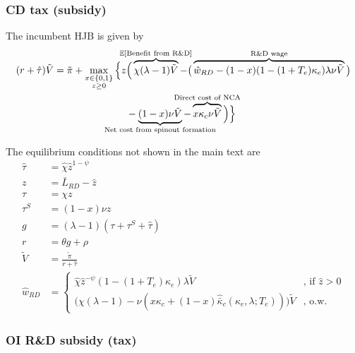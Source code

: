 \documentclass[11pt,english]{article}
\begin{document}
\subsubsection{CD tax (subsidy)}\label{appendix:model:efficiencyderivations:CDtax}

The incumbent HJB is given by 
\begin{align}
(r + \hat{\tau}) \tilde{V} = \tilde{\pi} + \max_{\substack{x \in \{0,1\} \\ z \ge 0}} \Big\{z &\Big( \overbrace{\chi (\lambda - 1) \tilde{V}}^{\mathclap{\mathbb{E}[\textrm{Benefit from R\&D}]}}-  \big( \overbrace{\hat{w}_{RD} - (1-x)(1-(1+T_e)\kappa_e)\lambda \nu \tilde{V}}^{\mathclap{\text{R\&D wage}}}\big) \label{eq:hjb_incumbent_entryTax} \nonumber \\ 
&-  \underbrace{(1-x) \nu \tilde{V}}_{\mathclap{\text{Net cost from spinout formation}}} - \overbrace{x \kappa_{c} \nu \tilde{V}}^{\mathclap{\text{Direct cost of NCA}}}\Big) \Big\} 
\end{align}

The equilibrium conditions not shown in the main text are
\begin{align}
\hat{\tau} &= \hat{\chi} \hat{z}^{1-\psi} \\
z &= \bar{L}_{RD} - \hat{z} \label{eq:labor_resource_constraint_entryTax}\\ 
\tau &= \chi z \\
\tau^S &= (1-x) \nu z \\
g &= (\lambda - 1) (\tau + \tau^S + \hat{\tau}) \\
r &= \theta g + \rho \\
\tilde{V} &= \frac{\tilde{\pi}}{r + \hat{\tau}} \\ 
\hat{w}_{RD} &= \begin{cases}
\hat{\chi} \hat{z}^{-\psi} (1-(1+T_e)\kappa_e) \lambda \tilde{V} &\textrm{, if } \hat{z} > 0\\
\Big( \chi(\lambda -1) - \nu (x\kappa_c + (1-x)\hat{\bar{\kappa}}_c(\kappa_e,\lambda;T_e))\Big) \tilde{V} &\textrm{, o.w.}
\end{cases} \label{eq:wage_rd_labor_entryTax}
\end{align}


\subsubsection{OI R\&D subsidy (tax)}\label{appendix:model:efficiencyderivations:OIRDtax}
\end{document}
